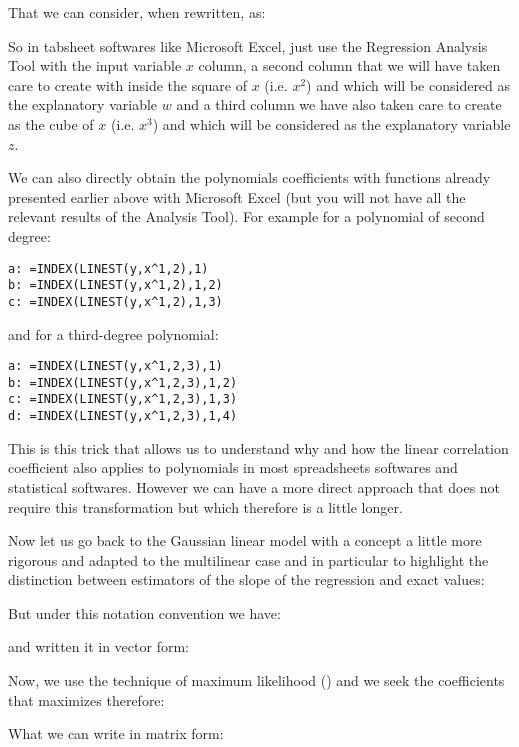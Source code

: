 	That we can consider, when rewritten, as:
	
	So in tabsheet softwares like Microsoft Excel, just use the Regression Analysis Tool with the input variable $x$ column, a second column that we will have taken care to create with inside the square of $x$ (i.e. $x^2$) and which will be considered as the explanatory variable $w$ and a third column we have also taken care to create as the cube of $x$ (i.e. $x^3$) and which will be considered as the explanatory variable $z$.
	
	We can also directly obtain the polynomials coefficients with functions already presented earlier above with Microsoft Excel (but you will not have all the relevant results of the Analysis Tool). For example for a polynomial of second degree:
	
	\texttt{a: =INDEX(LINEST(y,x\string^{1,2}),1)\\
	b: =INDEX(LINEST(y,x\string^{1,2}),1,2)\\
	c: =INDEX(LINEST(y,x\string^{1,2}),1,3)
	}
	
	and for a third-degree polynomial:
	
	\texttt{a: =INDEX(LINEST(y,x\string^{1,2,3}),1)\\
	b: =INDEX(LINEST(y,x\string^{1,2,3}),1,2)\\
	c: =INDEX(LINEST(y,x\string^{1,2,3}),1,3)\\
	d: =INDEX(LINEST(y,x\string^{1,2,3}),1,4)}
	
	This is this trick that allows us to understand why and how the linear correlation coefficient also applies to polynomials in most spreadsheets softwares and statistical softwares. However we can have a more direct approach that does not require this transformation but which therefore is a little longer.
	
	Now let us go back to the Gaussian linear model with a concept a little more rigorous and adapted to the multilinear case and in particular to highlight the distinction between estimators of the slope of the regression and exact values:
	
	But under this notation convention we have:
	
	and written it in vector form:
	
	Now, we use the technique of maximum likelihood () and we seek the coefficients that maximizes therefore:
	
	What we can write in matrix form:
	
